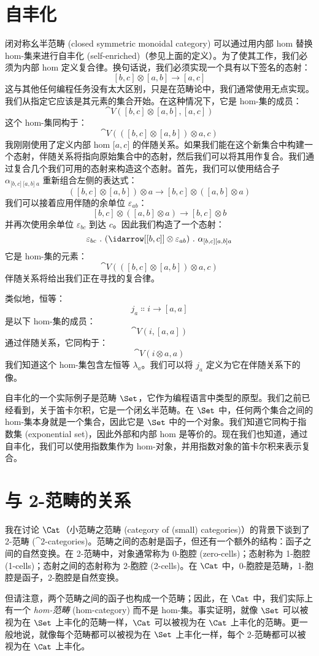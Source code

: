 \section{自丰化}

闭对称幺半范畴 (closed symmetric monoidal category) 可以通过用内部 hom 替换 hom-集来进行自丰化 (self-enriched)（参见上面的定义）。为了使其工作，我们必须为内部 hom 定义复合律。换句话说，我们必须实现一个具有以下签名的态射：
\[[b, c] \otimes [a, b] \to [a, c]\]
这与其他任何编程任务没有太大区别，只是在范畴论中，我们通常使用无点实现。我们从指定它应该是其元素的集合开始。在这种情况下，它是 hom-集的成员：
\[\cat{V}([b, c] \otimes [a, b], [a, c])\]
这个 hom-集同构于：
\[\cat{V}(([b, c] \otimes [a, b]) \otimes a, c)\]
我刚刚使用了定义内部 hom ${[}a, c{]}$ 的伴随关系。如果我们能在这个新集合中构建一个态射，伴随关系将指向原始集合中的态射，然后我们可以将其用作复合。我们通过复合几个我们可用的态射来构造这个态射。首先，我们可以使用结合子 $\alpha_{{[}b, c{]}\ {[}a, b{]}\ a}$ 重新组合左侧的表达式：
\[([b, c] \otimes [a, b]) \otimes a \to [b, c] \otimes ([a, b] \otimes a)\]
我们可以接着应用伴随的余单位 $\varepsilon_{a b}$：
\[[b, c] \otimes ([a, b] \otimes a) \to [b, c] \otimes b\]
并再次使用余单位 $\varepsilon_{b c}$ 到达 $c$。因此我们构造了一个态射：
\[\varepsilon_{b c}\ .\ (\idarrow[{[b, c]}] \otimes \varepsilon_{a b})\ .\ \alpha_{[b, c] [a, b] a}\]
它是 hom-集的元素：
\[\cat{V}(([b, c] \otimes [a, b]) \otimes a, c)\]
伴随关系将给出我们正在寻找的复合律。

类似地，恒等：
\[j_a \Colon i \to [a, a]\]
是以下 hom-集的成员：
\[\cat{V}(i, [a, a])\]
通过伴随关系，它同构于：
\[\cat{V}(i \otimes a, a)\]
我们知道这个 hom-集包含左恒等 $\lambda_a$。我们可以将 $j_a$ 定义为它在伴随关系下的像。

自丰化的一个实际例子是范畴 $\Set$，它作为编程语言中类型的原型。我们之前已经看到，关于笛卡尔积，它是一个闭幺半范畴。在 $\Set$ 中，任何两个集合之间的 hom-集本身就是一个集合，因此它是 $\Set$ 中的一个对象。我们知道它同构于指数集 (exponential set)，因此外部和内部 hom 是等价的。现在我们也知道，通过自丰化，我们可以使用指数集作为 hom-对象，并用指数对象的笛卡尔积来表示复合。

\section{与 2-范畴的关系}

我在讨论 $\Cat$（小范畴之范畴 (category of (small) categories)）的背景下谈到了 2-范畴 ($\cat{2}$-categories)。范畴之间的态射是函子，但还有一个额外的结构：函子之间的自然变换。在 2-范畴中，对象通常称为 0-胞腔 (zero-cells)；态射称为 1-胞腔 (1-cells)；态射之间的态射称为 2-胞腔 (2-cells)。在 $\Cat$ 中，0-胞腔是范畴，1-胞腔是函子，2-胞腔是自然变换。

但请注意，两个范畴之间的函子也构成一个范畴；因此，在 $\Cat$ 中，我们实际上有一个 \emph{hom-范畴} (hom-category) 而不是 hom-集。事实证明，就像 $\Set$ 可以被视为在 $\Set$ 上丰化的范畴一样，$\Cat$ 可以被视为在 $\Cat$ 上丰化的范畴。更一般地说，就像每个范畴都可以被视为在 $\Set$ 上丰化一样，每个 2-范畴都可以被视为在 $\Cat$ 上丰化。
